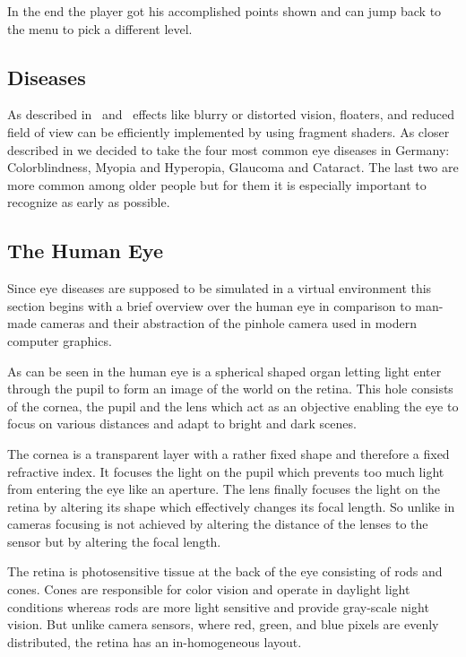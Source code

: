 \documentclass{sig-alternate-05-2015}
\begin{document}
In the end the player got his accomplished points shown and can jump back to the menu to pick a different level. 

\subsection{Diseases}

As described in \cite{gazedisplays} and \cite{eyediseasesim} effects like blurry or distorted vision, floaters, and reduced field of view can be efficiently implemented by using fragment shaders.
As closer described in  we decided to take the four most common eye diseases in Germany: Colorblindness, Myopia and Hyperopia, Glaucoma and Cataract.
The last two are more common among older people but for them it is especially important to recognize as early as possible. 

\subsection{The Human Eye}
\label{sec:eyediseases}
Since eye diseases are supposed to be simulated in a virtual environment this section begins with a brief overview over the human eye in comparison to man-made cameras and their abstraction of the pinhole camera used in modern computer graphics.

As can be seen in  the human eye is a spherical shaped organ letting light enter through the pupil to form an image of the world on the retina.
This hole consists of the cornea, the pupil and the lens which act as an objective enabling the eye to focus on various distances and adapt to bright and dark scenes.

The cornea is a transparent layer with a rather fixed shape and therefore a fixed refractive index.
It focuses the light on the pupil which prevents too much light from entering the eye like an aperture.
The lens finally focuses the light on the retina by altering its shape which effectively changes its focal length.
So unlike in cameras focusing is not achieved by altering the distance of the lenses to the sensor but by altering the focal length.

The retina is photosensitive tissue at the back of the eye consisting of rods and cones.
Cones are responsible for color vision and operate in daylight light conditions whereas rods are more light sensitive and provide gray-scale night vision.
But unlike camera sensors, where red, green, and blue pixels are evenly distributed, the retina has an in-homogeneous layout.
\end{document}
